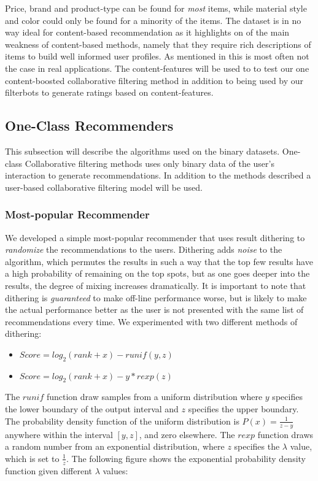 Price, brand and product-type can be found for \emph{most} items, while material style
and color could only be found for a minority of the items. The dataset is in no way ideal
for content-based recommendation as it highlights on of the main weakness of content-based
methods, namely that they require rich descriptions of items to build well informed user
profiles. As mentioned in \cite{meyer2012recommender} this is most often not the case in
real applications. The content-features will be used to to test our one content-boosted collaborative
filtering method \cite{Gantner2010} in addition to being used by our filterbots to generate ratings based
on content-features.

\subsection{One-Class Recommenders}

This subsection will describe the algorithms used on the binary datasets. One-class Collaborative
filtering methods uses only binary data of the user's interaction to generate recommendations.
In addition to the methods described a user-based collaborative filtering model will be used.

\subsubsection{Most-popular Recommender}

We developed a simple most-popular recommender that uses result dithering to \emph{randomize}
the recommendations to the users. Dithering adds \emph{noise} to the algorithm, which permutes
the results in such a way that the top few results have a high probability of remaining on the top spots,
but as one goes deeper into the results, the degree of mixing increases dramatically. It is important to
note that dithering is \emph{guaranteed} to make off-line performance worse, but is likely to make the
actual performance better as the user is not presented with the same list of recommendations every
time. We experimented with two different methods of dithering:

\begin{itemize}
\item $Score = log_2(rank+x) - runif(y, z)$
\item $Score = log_2(rank+x) - y*rexp(z)$
\end{itemize}

The $runif$ function draw samples from a uniform distribution where $y$ specifies the lower boundary
of the output interval and $z$ specifies the upper boundary. The probability density function of the
uniform distribution is $P(x) = \frac{1}{z-y}$ anywhere within the interval $[y, z]$, and zero elsewhere.
The $rexp$ function draws a random number from an exponential distribution, where $z$ specifies the
$\lambda$ value, which is set to $\frac{1}{z}$. The following figure shows the exponential probability
density function given different $\lambda$ values:

